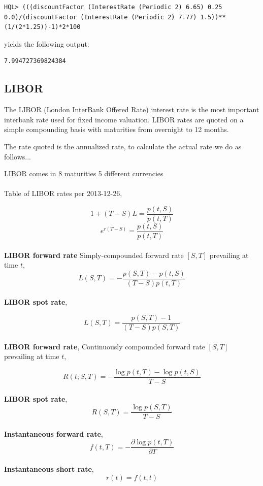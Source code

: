 \documentclass[11pt,a4paper]{article}
\numberwithin{equation}{section}
\begin{document}
\FrameSep
\begin{lstlisting}
HQL> (((discountFactor (InterestRate (Periodic 2) 6.65) 0.25 0.0)/(discountFactor (InterestRate (Periodic 2) 7.77) 1.5))**(1/(2*1.25))-1)*2*100
\end{lstlisting}
yields the following output:
\FrameSep
\begin{lstlisting}[style=Output]
7.994727369824384
\end{lstlisting}

\subsection{LIBOR}
The LIBOR (London InterBank Offered Rate) interest rate is the most important interbank rate
used for fixed income valuation. LIBOR rates are quoted on a simple compounding basis with maturities
from overnight to 12 months.

The rate quoted is the annualized rate, to calculate the actual rate we do as follows...

LIBOR comes in 8 maturities
5 different currencies
\\
\\
Table of LIBOR rates per 2013-12-26,




\[ 
1+(T-S)L=\frac{p(t,S)}{p(t,T)}
\]
\[ 
e^{r(T-S)}=\frac{p(t,S)}{p(t,T)}
\]
\\
\textbf{LIBOR forward rate}
Simply-compounded forward rate $[S,T]$ prevailing at time $t$,
\[
L(S,T) = -\frac{p(S,T)-p(t,S)}{(T-S)p(t,T)}
\]
\\
\textbf{LIBOR spot rate},

\[
L(S,T)=\frac{p(S,T)-1}{(T-S)p(S,T)}
\]
\\
\textbf{LIBOR forward rate},
Continuously compounded forward rate $[S,T]$ prevailing at time $t$,

\[
R(t;S,T)=-\frac{\log{p(t,T)}-\log{p(t,S)}}{T-S}
\]
\\
\textbf{LIBOR spot rate},
\[
R(S,T)=\frac{\log{p(S,T)}}{T-S}
\]
\\
\textbf{Instantaneous forward rate},
\[
f(t,T)=-\frac{\partial\log{p(t,T)}}{\partial{T}}
\]
\\
\textbf{Instantaneous short rate},
\[
r(t)=f(t,t)
\]
\end{document}
